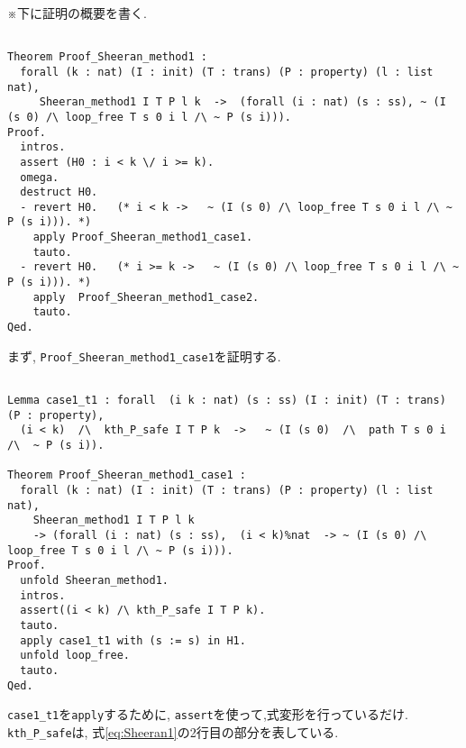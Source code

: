 \documentclass{jsarticle}
\begin{document}
※下に証明の概要を書く. \\

\begin{lstlisting}[language = Coq, frame=tb, framesep=5pt, breaklines = true] % path

Theorem Proof_Sheeran_method1 :
  forall (k : nat) (I : init) (T : trans) (P : property) (l : list nat),
     Sheeran_method1 I T P l k  ->  (forall (i : nat) (s : ss), ~ (I (s 0) /\ loop_free T s 0 i l /\ ~ P (s i))).
Proof.
  intros.
  assert (H0 : i < k \/ i >= k).
  omega.
  destruct H0.
  - revert H0.   (* i < k ->   ~ (I (s 0) /\ loop_free T s 0 i l /\ ~ P (s i))). *)
    apply Proof_Sheeran_method1_case1. 
    tauto.   
  - revert H0.   (* i >= k ->   ~ (I (s 0) /\ loop_free T s 0 i l /\ ~ P (s i))). *)
    apply  Proof_Sheeran_method1_case2.
    tauto.
Qed.
\end{lstlisting}

\newpage

まず, \texttt{Proof\_Sheeran\_method1\_case1}を証明する.

\begin{lstlisting}[language = Coq, frame=tb, framesep=5pt, breaklines = true] % path

Lemma case1_t1 : forall  (i k : nat) (s : ss) (I : init) (T : trans) (P : property),
  (i < k)  /\  kth_P_safe I T P k  ->   ~ (I (s 0)  /\  path T s 0 i  /\  ~ P (s i)).

Theorem Proof_Sheeran_method1_case1 :
  forall (k : nat) (I : init) (T : trans) (P : property) (l : list nat),
    Sheeran_method1 I T P l k
    -> (forall (i : nat) (s : ss),  (i < k)%nat  -> ~ (I (s 0) /\ loop_free T s 0 i l /\ ~ P (s i))).
Proof.
  unfold Sheeran_method1.
  intros.
  assert((i < k) /\ kth_P_safe I T P k).
  tauto.
  apply case1_t1 with (s := s) in H1.  
  unfold loop_free.
  tauto.
Qed.
\end{lstlisting}
\texttt{case1\_t1}を\texttt{apply}するために, \texttt{assert}を使って,式変形を行っているだけ.
\texttt{kth\_P\_safe}は, 式\eqref{eq:Sheeran1}の2行目の部分を表している.\\
\end{document}
